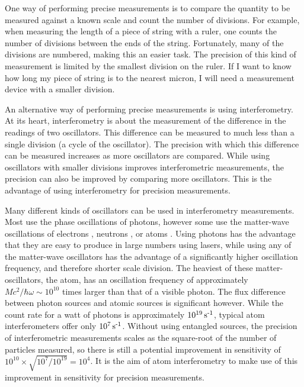 One way of performing precise measurements is to compare the quantity to be measured against a known scale and count the number of divisions.  For example, when measuring the length of a piece of string with a ruler, one counts the number of divisions between the ends of the string.  Fortunately, many of the divisions are numbered, making this an easier task.  The precision of this kind of measurement is limited by the smallest division on the ruler.  If I want to know how long my piece of string is to the nearest micron, I will need a measurement device with a smaller division.

An alternative way of performing precise measurements is using interferometry.  At its heart, interferometry is about the measurement of the difference in the readings of two oscillators.  This difference can be measured to much less than a single division (a cycle of the oscillator).  The precision with which this difference can be measured increases as more oscillators are compared.  While using oscillators with smaller divisions improves interferometric measurements, the precision can also be improved by comparing more oscillators.  This is the advantage of using interferometry for precision measurements.

Many different kinds of oscillators can be used in interferometry measurements.  Most use the phase oscillations of photons, however some use the matter-wave oscillations of electrons \citep{Missiroli:1981}, neutrons \citep{Rauch:1974}, or atoms \citep{Keith:1991,Carnal:1991,Riehle:1991,Kasevich:1991}.  Using photons has the advantage that they are easy to produce in large numbers using lasers, while using any of the matter-wave oscillators has the advantage of a significantly higher oscillation frequency, and therefore shorter scale division.  The heaviest of these matter-oscillators, the atom, has an oscillation frequency of approximately $M c^2 / \hbar \omega \sim 10^{10}$ times larger than that of a visible photon.  The flux difference between photon sources and atomic sources is significant however.  While the count rate for a watt of photons is approximately $\unit[10^{19}]{s\textsuperscript{-1}}$, typical atom interferometers offer only $\unit[10^{7}]{s\textsuperscript{-1}}$.  Without using entangled sources, the precision of interferometric measurements scales as the square-root of the number of particles measured, so there is still a potential improvement in sensitivity of $10^{10} \times \sqrt{10^7/10^{19}} = 10^4$.  It is the aim of atom interferometry to make use of this improvement in sensitivity for precision measurements.

